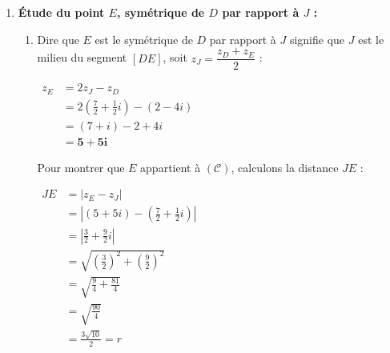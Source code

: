 \documentclass[12pt,a4paper]{article}
\begin{document}
\begin{enumerate}
    Le triangle $ADB$ étant rectangle en $D$, son cercle circonscrit $(\mathcal{C})$ admet pour diamètre son hypoténuse $[AB]$.
    
    \begin{itemize}
        \item Le centre $J$ de $(\mathcal{C})$ est donc le milieu du segment $[AB]$ :
        
        $
        \begin{aligned}
            z_J &= \frac{z_A + z_B}{2}\\
            &= \frac{(2 + 5i) + (5 - 4i)}{2}\\
            &= \mathbf{\frac{7}{2} + \frac{1}{2}i}
        \end{aligned}
        $
        
        \item Le rayon $r$ de $(\mathcal{C})$ est la moitié de la longueur $AB$ :
        
        $
        \begin{aligned}
            r &= \frac{AB}{2}\\
            &= \mathbf{\frac{3\sqrt{10}}{2}\text{ cm}}
        \end{aligned}
        $
    \end{itemize}

    \item \textbf{Étude du point $E$, symétrique de $D$ par rapport à $J$ :}
    
    \begin{enumerate}
        \item Dire que $E$ est le symétrique de $D$ par rapport à $J$ signifie que $J$ est le milieu du segment $[DE]$, soit $z_J = \dfrac{z_D + z_E}{2}$ :
        
        $
        \begin{aligned}
            z_E &= 2z_J - z_D\\
            &= 2\left(\frac{7}{2} + \frac{1}{2}i\right) - (2 - 4i)\\
            &= (7 + i) - 2 + 4i\\
            &= \mathbf{5 + 5i}
        \end{aligned}
        $
        
        Pour montrer que $E$ appartient à $(\mathcal{C})$, calculons la distance $JE$ :
        
        $
        \begin{aligned}
            JE &= |z_E - z_J|\\
            &= \left|(5 + 5i) - \left(\frac{7}{2} + \frac{1}{2}i\right)\right|\\
            &= \left|\frac{3}{2} + \frac{9}{2}i\right|\\
            &= \sqrt{\left(\frac{3}{2}\right)^2 + \left(\frac{9}{2}\right)^2}\\
            &= \sqrt{\frac{9}{4} + \frac{81}{4}}\\
            &= \sqrt{\frac{90}{4}}\\
            &= \frac{3\sqrt{10}}{2} = r
        \end{aligned}
        $
        

\end{enumerate}
\end{enumerate}
\end{document}
